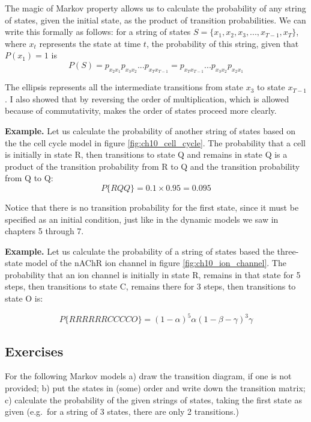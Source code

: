 \documentclass[
]{book}
\theoremstyle{definition}
\theoremstyle{definition}
\theoremstyle{definition}
\theoremstyle{remark}
\begin{document}
The magic of Markov property allows us to calculate the probability of any string of states, given the initial state, as the product of transition probabilities. We can write this formally as follows: for a string of states \(S = \{x_1, x_2, x_3, ... , x_{T-1}, x_T\}\), where \(x_t\) represents the state at time \(t\), the probability of this string, given that \(P(x_1) = 1\) is
\[ 
P(S) =  p_{x_2x_1} p_{x_3x_2} ... p_{x_Tx_{T-1}} =  p_{x_Tx_{T-1}} ... p_{x_3x_2}p_{x_2x_1}
\]

The ellipsis represents all the intermediate transitions from state \(x_3\) to state \(x_{T-1}\). I also showed that by reversing the order of multiplication, which is allowed because of commutativity, makes the order of states proceed more clearly.

\textbf{Example.} Let us calculate the probability of another string of states based on the the cell cycle model in figure \ref{fig:ch10_cell_cycle}. The probability that a cell is initially in state R, then transitions to state Q and remains in state Q is a product of the transition probability from R to Q and the transition probability from Q to Q:
\[ 
P\{RQQ\} = 0.1 \times 0.95=0.095
\]

Notice that there is no transition probability for the first state, since it must be specified as an initial condition, just like in the dynamic models we saw in chapters 5 through 7.

\textbf{Example.} Let us calculate the probability of a string of states based the three-state model of the nAChR ion channel in figure \ref{fig:ch10_ion_channel}. The probability that an ion channel is initially in state R, remains in that state for 5 steps, then transitions to state C, remains there for 3 steps, then transitions to state O is:

\[ 
P\{RRRRRRCCCCO\} =  (1-\alpha)^5 \alpha (1-\beta-\gamma)^3 \gamma
\]

\hypertarget{exercises-27}{%
\subsection{Exercises}\label{exercises-27}}

For the following Markov models a) draw the transition diagram, if one is not provided; b) put the states in (some) order and write down the transition matrix; c) calculate the probability of the given strings of states, taking the first state as given (e.g.~for a string of 3 states, there are only 2 transitions.)
\end{document}
